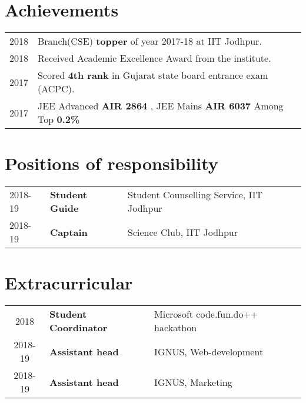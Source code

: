 \documentclass[a4paper]{deedy-resume-openfont}
\begin{document}
\begin{minipage}[t]{0.63\textwidth}
\section{Achievements}
\begin{tabular}{l p{}}
2018 & Branch(CSE) \textbf{topper} of year 2017-18 at IIT Jodhpur. \\
2018 & Received Academic Excellence Award from the institute. \\
2017 & Scored \textbf{4th rank} in Gujarat state board entrance exam (ACPC). \\
2017 & JEE Advanced \textbf{AIR 2864} , JEE Mains \textbf{AIR 6037} Among Top \textbf{0.2\%} \\
\end{tabular}
\sectionsep


\section{Positions of responsibility}
\begin{tabular}{ l l l }
2018-19 & \textbf{Student Guide} & Student Counselling Service, IIT Jodhpur \\
2018-19 & \textbf{Captain} & Science Club, IIT Jodhpur \\  
\end{tabular}

\section{Extracurricular}
\begin{tabular}{ c l l }
   2018  & \textbf{Student Coordinator} & Microsoft code.fun.do++ hackathon\\
 2018-19 & \textbf{Assistant head} & IGNUS, Web-development \\
 2018-19 & \textbf{Assistant head} & IGNUS, Marketing
 \end{tabular}
 
\end{minipage} 
\end{document}
